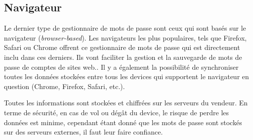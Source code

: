 \subsection{Navigateur}
Le dernier type de gestionnaire de mots de passe sont ceux qui sont basés sur le navigateur (\textit{browser-based}). Les navigateurs les plus populaires, tels que Firefox, Safari ou Chrome offrent ce gestionnaire de mots de passe qui est directement inclu dans ces derniers.
Ils vont faciliter la gestion et la sauvegarde de mots de passe de comptes de sites web.. Il y a également la possibilité de synchroniser toutes les données stockées entre tous les devices qui supportent le navigateur en question (Chrome, Firefox, Safari, etc.).

Toutes les informations sont stockées et chiffrées sur les serveurs du vendeur. En terme de sécurité, en cas de vol ou dégât du device, le risque de perdre les données est minime, cependant étant donné que les mots de passe sont stockés sur des serveurs externes, il faut leur faire confiance.
